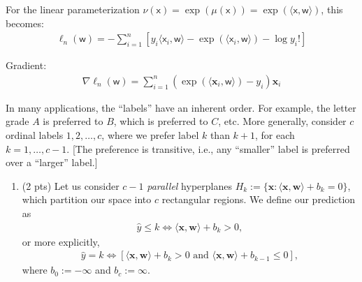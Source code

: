 \documentclass[10pt]{article}
\newcommand{\wv}{\mathbf{w}}
\newcommand{\xv}{\mathbf{x}}
\newcommand{\inner}[2]{\langle #1, #2 \rangle}
\newcommand{\xbs}{\bm{\mathsf{x}}}
\newcommand{\wbs}{\bm{\mathsf{w}}}
\newcommand{\ie}{{i.e.}\xspace}
\newcommand{\etc}{{etc.}\xspace}
\begin{document}
\begin{exercise}
\begin{enumerate}
          For the linear parameterization $\nu(\xbs) = \exp(\mu(\xbs))=\exp(\inner{\xbs}{\wbs})$, this becomes:
          \begin{align}
            \boxed{\ell_n(\wbs) = -\sum_{i=1}^n \left[ y_i \inner{\xbs_i}{\wbs} - \exp(\inner{\xbs_i}{\wbs}) - \log y_i! \right]}
          \end{align}

          Gradient:
          \begin{align}
            \boxed{\nabla \ell_n(\wbs) = \sum_{i=1}^n  (\exp(\inner{\xv_i}{\wbs})-y_i) \xv_i}
          \end{align}
  \end{enumerate}
\end{exercise}

\newpage
\begin{exercise}
  In many applications, the ``labels'' have an inherent order. For example, the letter grade $A$ is preferred to $B$, which is preferred to $C$, \etc More generally, consider $c$ ordinal labels $1, 2, \ldots, c$, where we prefer label $k$ than $k+1$, for each $k=1, \ldots, c-1$. [The preference is transitive, \ie, any ``smaller'' label is preferred over a ``larger'' label.]

  \begin{enumerate}

    \item (2 pts) Let us consider $c-1$ \emph{parallel} hyperplanes
          $H_k := \{\xv : \inner{\xv}{\wv} + b_k = 0 \}$, which partition our space into $c$ rectangular regions. We define our prediction as
          \begin{align}
            \hat y \leq k \iff \inner{\xv}{\wv} + b_{k} > 0,
          \end{align}
          or more explicitly,
          \begin{align}
            \hat y = k \iff [\inner{\xv}{\wv} + b_{k} > 0 \mbox{ and } \inner{\xv}{\wv} + b_{k-1} \leq 0 ],
          \end{align}
          where $b_0 := -\infty$ and $b_c := \infty$.

          \begin{center}
          \end{center}


\end{enumerate}
\end{exercise}
\end{document}
